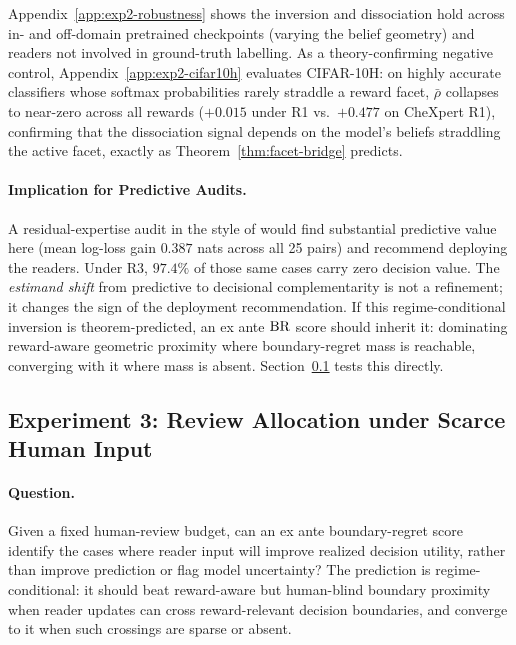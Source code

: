 Appendix~\ref{app:exp2-robustness} shows the inversion and dissociation hold across in- and off-domain pretrained checkpoints (varying the belief geometry) and readers not involved in ground-truth labelling.
As a theory-confirming negative control, Appendix~\ref{app:exp2-cifar10h} evaluates CIFAR-10H: on highly accurate classifiers whose softmax probabilities rarely straddle a reward facet, $\bar\rho$ collapses to near-zero across all rewards ($+0.015$ under R1 vs.\ $+0.477$ on CheXpert R1), confirming that the dissociation signal depends on the model's beliefs straddling the active facet, exactly as Theorem~\ref{thm:facet-bridge} predicts.

\paragraph{Implication for Predictive Audits.}
A residual-expertise audit in the style of \citet{AlurEtAl2023,AlurRaghavanShah2024} would find substantial predictive value here (mean log-loss gain $0.387$ nats across all 25 pairs) and recommend deploying the readers.
Under R3, $97.4\%$ of those same cases carry zero decision value.
The \emph{estimand shift} from predictive to decisional complementarity is not a refinement; it changes the sign of the deployment recommendation.
If this regime-conditional inversion is theorem-predicted, an ex ante $\operatorname{BR}$ score should inherit it: dominating reward-aware geometric proximity where boundary-regret mass is reachable, converging with it where mass is absent.
Section~\ref{sec:exp3} tests this directly.


\subsection{Experiment 3: Review Allocation under Scarce Human Input}
\label{sec:exp3}

\paragraph{Question.}
Given a fixed human-review budget, can an ex ante boundary-regret score identify the cases where reader input will improve realized decision utility, rather than improve prediction or flag model uncertainty?
The prediction is regime-conditional: it should beat reward-aware but human-blind boundary proximity when reader updates can cross reward-relevant decision boundaries, and converge to it when such crossings are sparse or absent.


